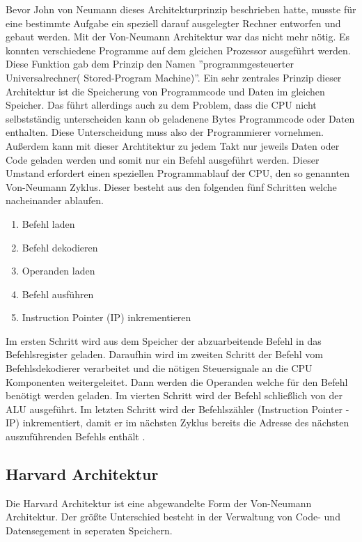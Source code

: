 \documentclass[12pt]{article}
\begin{document}
\noindent Bevor John von Neumann dieses Architekturprinzip beschrieben hatte, musste für eine bestimmte Aufgabe ein speziell darauf ausgelegter Rechner entworfen und gebaut werden. Mit der Von-Neumann Architektur war das nicht mehr nötig. Es konnten verschiedene Programme auf dem gleichen Prozessor ausgeführt werden. Diese Funktion gab dem Prinzip den Namen ''programmgesteuerter Universalrechner( Stored-Program Machine)''\cite{TaschenbuchMikroprozessortechnik}.
Ein sehr zentrales Prinzip dieser Architektur ist die Speicherung von Programmcode und Daten im gleichen Speicher. Das führt allerdings auch zu dem Problem, dass die CPU nicht selbstständig unterscheiden kann ob geladenene Bytes Programmcode oder Daten enthalten. Diese Unterscheidung muss also der Programmierer vornehmen. Außerdem kann mit dieser Archtitektur zu jedem Takt nur jeweils Daten oder Code geladen werden und somit nur ein Befehl ausgeführt werden. Dieser Umstand erfordert einen speziellen Programmablauf der CPU, den so genannten Von-Neumann Zyklus. Dieser besteht aus den folgenden fünf Schritten welche nacheinander ablaufen.
\begin{enumerate}
\item Befehl laden 
\item Befehl dekodieren
\item Operanden laden
\item Befehl ausführen
\item Instruction Pointer (IP) inkrementieren
\end{enumerate}
Im ersten Schritt wird aus dem Speicher der abzuarbeitende Befehl in das Befehlsregister geladen. Daraufhin wird im zweiten Schritt der Befehl vom Befehlsdekodierer verarbeitet und die nötigen Steuersignale an die CPU Komponenten weitergeleitet. Dann werden die Operanden welche für den Befehl benötigt werden geladen. Im vierten Schritt wird der Befehl schließlich von der ALU ausgeführt. Im letzten Schritt wird der Befehlszähler (Instruction Pointer - IP) inkrementiert, damit er im nächsten Zyklus bereits die Adresse des nächsten auszuführenden Befehls enthält \cite{unikoelnvnz}.
\subsection{Harvard Architektur} 
Die Harvard Architektur ist eine abgewandelte Form der Von-Neumann Architektur. Der größte Unterschied besteht in der Verwaltung von Code- und Datensegement in seperaten Speichern.
\end{document}
